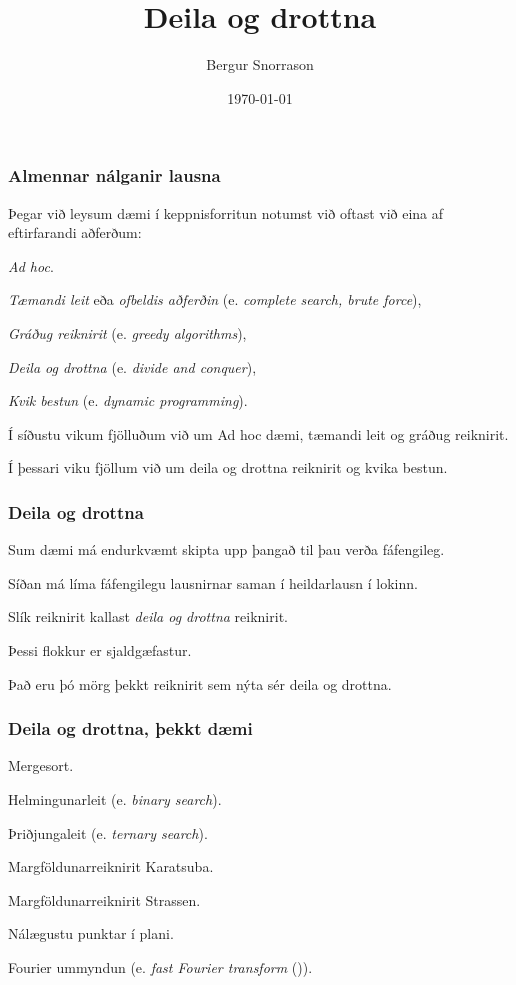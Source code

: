 \title{Deila og drottna}
\author{Bergur Snorrason}
\date{\today}



\frame{\titlepage}

{
    \frametitle{Almennar nálganir lausna}
    {
        \item<1-> Þegar við leysum dæmi í keppnisforritun notumst við oftast við eina af eftirfarandi aðferðum:
        {
            \item<2-> \emph{Ad hoc}.
            \item<3-> \emph{Tæmandi leit} eða \emph{ofbeldis aðferðin} (e. \emph{complete search, brute force}),
            \item<4-> \emph{Gráðug reiknirit} (e. \emph{greedy algorithms}),
            \item<5-> \emph{Deila og drottna} (e. \emph{divide and conquer}),
            \item<6-> \emph{Kvik bestun} (e. \emph{dynamic programming}).
        }
        \item<7-> Í síðustu vikum fjölluðum við um Ad hoc dæmi, tæmandi leit og gráðug reiknirit.
        \item<8-> Í þessari viku fjöllum við um deila og drottna reiknirit og kvika bestun.
    }
}

{
    \frametitle{Deila og drottna}
    {
        \item<1-> Sum dæmi má endurkvæmt skipta upp þangað til þau verða fáfengileg.
        \item<2-> Síðan má líma fáfengilegu lausnirnar saman í heildarlausn í lokinn.
        \item<3-> Slík reiknirit kallast \emph{deila og drottna} reiknirit.
        \item<4-> Þessi flokkur er sjaldgæfastur.
        \item<5-> Það eru þó mörg þekkt reiknirit sem nýta sér deila og drottna.
    }
}

{
    \frametitle{Deila og drottna, þekkt dæmi}
    {
        \item<1-> Mergesort.
        \item<2-> Helmingunarleit (e. \emph{binary search}).
        \item<3-> Þriðjungaleit (e. \emph{ternary search}).
        \item<4-> Margföldunarreiknirit Karatsuba.
        \item<5-> Margföldunarreiknirit Strassen.
        \item<6-> Nálægustu punktar í plani.
        \item<7-> Fourier ummyndun (e. \emph{fast Fourier transform} ()).
    }
}

